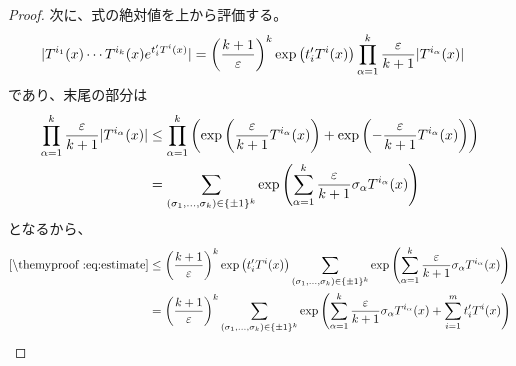 \documentclass[report]{jlreq}
\begin{document}
\begin{proof}
    次に、式の絶対値を上から評価する。
    \begin{alignat}{1}
        |T^{i_1}(x) \cdots T^{i_k}(x) e^{t'_i T^i(x)}|
            &=
                \myparen{
                    \frac{k + 1}{\eps}
                }^k
                \exp\myparen{t'_i T^i(x)} 
                \prod_{\alpha = 1}^k
                    \frac{\eps}{k + 1}
                    |T^{i_\alpha}(x)|
                \locallabel{eq:estimate}
    \end{alignat}
    であり、末尾の部分は
    \begin{alignat}{1}
        \prod_{\alpha = 1}^k
            \frac{\varepsilon}{k + 1}
            |T^{i_\alpha}(x)|
            &\le \prod_{\alpha = 1}^k
                \left({
                    \exp\left({
                        \frac{\varepsilon}{k + 1}
                        T^{i_\alpha}(x)
                    }\right)
                    + \exp\left({
                        - \frac{\varepsilon}{k + 1}
                        T^{i_\alpha}(x)
                    }\right)
                }\right)
                \\
            &= \sum_{(\sigma_1, \dots, \sigma_k) \in \{ \pm 1 \}^k}
                \exp\left({
                    \sum_{\alpha = 1}^k
                        \frac{\varepsilon}{k + 1}
                        \sigma_\alpha
                        T^{i_\alpha}(x)
                }\right)
    \end{alignat}
    となるから、
    \begin{alignat}{1}
        \localcref{eq:estimate}
            &\le
                \myparen{
                    \frac{k + 1}{\eps}
                }^k
                \exp\myparen{t'_i T^i(x)} 
                \sum_{(\sigma_1, \dots, \sigma_k) \in \{ \pm 1 \}^k}
                    \exp\myparen{
                        \sum_{\alpha = 1}^k
                            \frac{\eps}{k + 1}
                            \sigma_\alpha
                            T^{i_\alpha}(x)
                    }
                \\
            &=
                \myparen{
                    \frac{k + 1}{\eps}
                }^k
                \sum_{(\sigma_1, \dots, \sigma_k) \in \{ \pm 1 \}^k}
                    \exp\myparen{
                        \sum_{\alpha = 1}^k
                            \frac{\eps}{k + 1}
                            \sigma_\alpha
                            T^{i_\alpha}(x)
                        + \sum_{i = 1}^m
                            t'_i T^i(x)
                    }
                \\

\end{alignat}
\end{proof}
\end{document}
